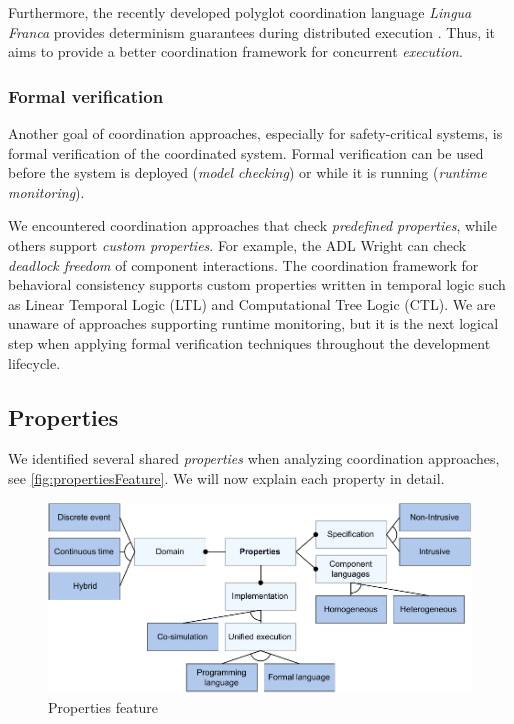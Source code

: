 \documentclass[runningheads]{llncs}
\begin{document}
Furthermore, the recently developed polyglot coordination language \textit{Lingua Franca} provides determinism guarantees during distributed execution \cite{lohstrohLinguaFrancaDeterministic2021}.
Thus, it aims to provide a better coordination framework for concurrent \textit{execution}.


\subsubsection{Formal verification} Another goal of coordination approaches, especially for safety-critical systems, is formal verification of the coordinated system.
Formal verification can be used before the system is deployed (\textit{model checking}) or while it is running (\textit{runtime monitoring}).

We encountered coordination approaches that check \textit{predefined properties}, while others support \textit{custom properties}.
For example, the ADL Wright \cite{allenFormalBasisArchitectural1997} can check \textit{deadlock freedom} of component interactions.
The coordination framework for behavioral consistency \cite{krauterBehavioralConsistencyMultimodeling2023} supports custom properties written in temporal logic such as Linear Temporal Logic (LTL) and Computational Tree Logic (CTL).
We are unaware of approaches supporting runtime monitoring, but it is the next logical step when applying formal verification techniques throughout the development lifecycle.

\subsection{Properties}
We identified several shared \textit{properties} when analyzing coordination approaches, see \autoref{fig:propertiesFeature}.
We will now explain each property in detail.

\begin{figure}[ht]
	\centering
	\includegraphics[width=1\textwidth]{images/properties_feature}
	\caption{Properties feature}
	\label{fig:propertiesFeature}
\end{figure}
\end{document}
